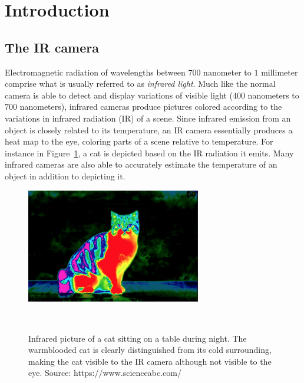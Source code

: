 \section{Introduction}


\subsection{The IR camera}
Electromagnetic radiation of wavelengths between $700$ nanometer to
$1$ millimeter comprise what is usually referred to as
\textit{infrared light}. Much like the normal camera is able to detect
and display variations of visible light ($400$ nanometers to $700$
nanometers), infrared cameras produce pictures colored
according to the variations in infrared radiation (IR) of a
scene. Since infrared emission from an object is closely related to
its temperature, an IR camera essentially produces a heat map to the
eye, coloring parts of a scene relative to temperature. For instance
in Figure~\ref{fig:cat}, a cat is depicted based on the IR radiation
it emits. Many infrared
cameras are also able to accurately estimate the temperature of an
object in addition to depicting it.


\begin{figure}[h]
\begin{center}
\includegraphics[height=5cm]{gfx/cat.png}
\caption{Infrared picture of a cat sitting on a table during
  night. The warmblooded cat is clearly distinguished from its cold
  surrounding, making the cat visible to the IR camera although not
  visible to the eye. Source:
  https://www.scienceabc.com/}~\label{fig:cat}
\end{center}
\end{figure}

